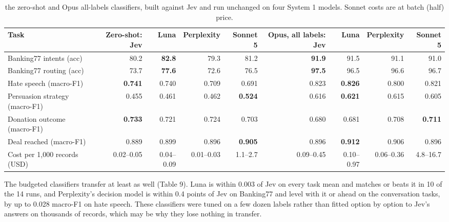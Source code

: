 \documentclass[11pt]{article}
\begin{document}
\begin{table}[t]
\centering\small\setlength{\tabcolsep}{3.5pt}
\begin{tabularx}{\textwidth}{lRRRRRRRR}
\toprule
Task & Zero-shot: Jev & Luna & Perplexity & Sonnet 5 & Opus, all labels: Jev & Luna & Perplexity & Sonnet 5 \\
\midrule
Banking77 intents (acc) & 80.2 & \textbf{82.8} & 79.3 & 81.2 & \textbf{91.9} & 91.5 & 91.1 & 91.0 \\
Banking77 routing (acc) & 73.7 & \textbf{77.6} & 72.6 & 76.5 & \textbf{97.5} & 96.5 & 96.6 & 96.7 \\
Hate speech (macro-F1) & \textbf{0.741} & 0.740 & 0.709 & 0.691 & 0.823 & \textbf{0.826} & 0.800 & 0.821 \\
Persuasion strategy (macro-F1) & 0.455 & 0.461 & 0.462 & \textbf{0.524} & 0.616 & \textbf{0.621} & 0.615 & 0.605 \\
Donation outcome (macro-F1) & \textbf{0.733} & 0.721 & 0.724 & 0.703 & 0.680 & 0.681 & 0.708 & \textbf{0.711} \\
Deal reached (macro-F1) & 0.889 & 0.899 & 0.896 & \textbf{0.905} & 0.896 & \textbf{0.912} & 0.906 & 0.896 \\
Cost per 1,000 records (USD) & 0.02--0.05 & 0.04--0.09 & 0.01--0.03 & 1.1--2.7 & 0.09--0.45 & 0.10--0.97 & 0.06--0.36 & 4.8--16.7 \\
\bottomrule
\end{tabularx}
\caption{the zero-shot and Opus all-labels classifiers, built against Jev and run unchanged on four System 1 models. Sonnet costs are at batch (half) price.}
\label{tab:8}
\end{table}

The budgeted classifiers transfer at least as well (Table 9). Luna is within 0.003 of Jev on every task mean and matches or beats it in 10 of the 14 runs, and Perplexity's decision model is within 0.4 points of Jev on Banking77 and level with it or ahead on the conversation tasks, by up to 0.028 macro-F1 on hate speech. These classifiers were tuned on a few dozen labels rather than fitted option by option to Jev's answers on thousands of records, which may be why they lose nothing in transfer.
\end{document}
